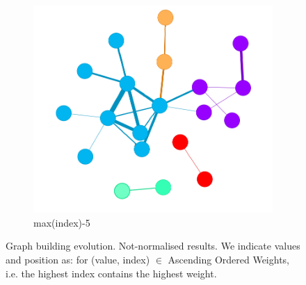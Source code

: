 \begin{figure}[!htb]
\begin{subfigure}[b]{0.15\linewidth}
		\includegraphics[width=\linewidth]{Minor Thesis/figures/graphs/nn/F.png}
		\caption{max(index)-5}
	\end{subfigure}
	\caption{Graph building evolution. Not-normalised results. We indicate values and position as: for (value, index) $\in$ Ascending Ordered Weights, i.e. the highest index contains the highest weight.}
	\label{fig:graph-evo-nn}
\end{figure}

